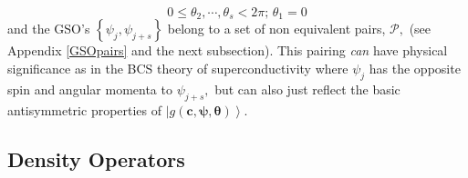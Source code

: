 \documentclass[aps,preprint]{revtex4}%
\begin{document}
\begin{equation}
0\leq\theta_{2},\cdots,\theta_{s}<2\pi;\,\theta_{1}=0 \label{Phases}%
\end{equation}
and the GSO's $\left\{  \psi_{j},\psi_{j+s}\right\}  $ belong to a set of non
equivalent pairs, $\mathcal{P},$ (see Appendix \ref{GSOpairs} and the next
subsection). This pairing \emph{can} have physical significance as in the BCS
theory of superconductivity \cite{Cooper1956,BCS1957,BCS2_1957} where
$\psi_{j}$ has the opposite spin and angular momenta to $\psi_{j+s},$ but can
also just reflect the basic antisymmetric properties of $\left\vert g\left(
\boldsymbol{c},\boldsymbol{\psi},\boldsymbol{\theta}\right)  \right\rangle $.

\subsection{Density Operators\label{DenOp}}
\end{document}
